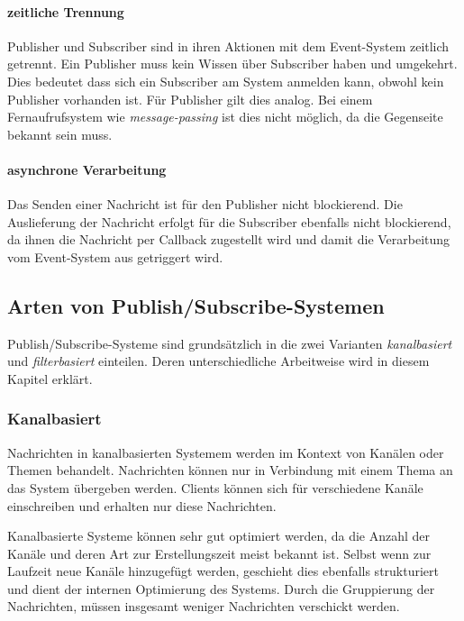 \paragraph{zeitliche Trennung}
Publisher und Subscriber sind in ihren Aktionen mit dem Event-System zeitlich getrennt. Ein Publisher muss kein Wissen über Subscriber haben und umgekehrt. Dies bedeutet dass sich ein Subscriber am System anmelden kann, obwohl kein Publisher vorhanden ist. Für Publisher gilt dies analog. Bei einem Fernaufrufsystem wie \emph{message-passing} ist dies nicht möglich, da die Gegenseite bekannt sein muss.


\paragraph{asynchrone Verarbeitung}
Das Senden einer Nachricht ist für den Publisher nicht blockierend. Die Auslieferung der Nachricht erfolgt für die Subscriber ebenfalls nicht blockierend, da ihnen die Nachricht per Callback zugestellt wird und damit die Verarbeitung vom Event-System aus getriggert wird.


\subsection{Arten von Publish/Subscribe-Systemen}
Publish/Subscribe-Systeme sind grundsätzlich in die zwei Varianten  \emph{kanalbasiert} und \emph{filterbasiert} einteilen. Deren unterschiedliche Arbeitweise wird in diesem Kapitel erklärt.

\subsubsection{Kanalbasiert}
\label{chap:grundlagen:pubsub:kanalbasiert}
Nachrichten in kanalbasierten Systemem werden im Kontext von Kanälen oder Themen behandelt. Nachrichten können nur in Verbindung mit einem Thema an das System übergeben werden. Clients können sich für verschiedene Kanäle einschreiben und erhalten nur diese Nachrichten.

Kanalbasierte Systeme können sehr gut optimiert werden, da die Anzahl der Kanäle und deren Art zur Erstellungszeit meist bekannt ist. Selbst wenn zur Laufzeit neue Kanäle hinzugefügt werden, geschieht dies ebenfalls strukturiert und dient der internen Optimierung des Systems. Durch die Gruppierung der Nachrichten, müssen insgesamt weniger Nachrichten verschickt werden.

